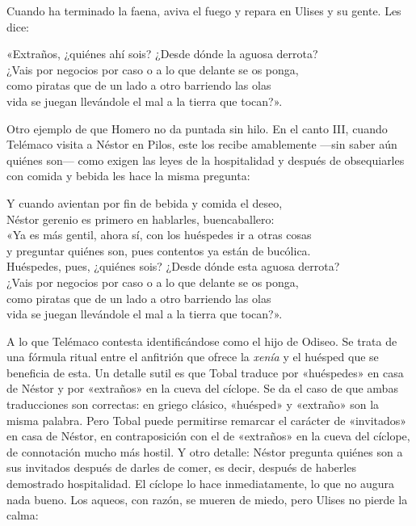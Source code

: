 Cuando ha terminado la faena, aviva el fuego y repara en Ulises y su gente. Les dice:

\begin{versocita}
«Extraños, ¿quiénes ahí sois? ¿Desde dónde la aguosa derrota?\\
¿Vais por negocios por caso o a lo que delante se os ponga,\\
como piratas que de un lado a otro barriendo las olas\\
vida se juegan llevándole el mal a la tierra que tocan?».
\end{versocita}

Otro ejemplo de que Homero no da puntada sin hilo. En el canto III, cuando Telémaco visita a Néstor en Pilos, este los recibe amablemente ---sin saber aún quiénes son--- como exigen las leyes de la hospitalidad y después de obsequiarles con comida y bebida les hace la misma pregunta:

\begin{versocita}
Y cuando avientan por fin de bebida y comida el deseo,\\
Néstor gerenio es primero en hablarles, buencaballero:\\
«Ya es más gentil, ahora sí, con los huéspedes ir a otras cosas\\
y preguntar quiénes son, pues contentos ya están de bucólica.\\
Huéspedes, pues, ¿quiénes sois? ¿Desde dónde esta aguosa derrota?\\
¿Vais por negocios por caso o a lo que delante se os ponga,\\
como piratas que de un lado a otro barriendo las olas\\
vida se juegan llevándole el mal a la tierra que tocan?».
\end{versocita}

A lo que Telémaco contesta identificándose como el hijo de Odiseo. Se trata de una fórmula ritual entre el anfitrión que ofrece la \emph{xenía} y el huésped que se beneficia de esta. Un detalle sutil es que Tobal traduce  por «huéspedes» en casa de Néstor y por «extraños» en la cueva del cíclope. Se da el caso de que ambas traducciones son correctas: en griego clásico, «huésped» y «extraño» son la misma palabra. Pero Tobal puede permitirse remarcar el carácter de «invitados» en casa de Néstor, en contraposición con el de «extraños» en la cueva del cíclope, de connotación mucho más hostil. Y otro detalle: Néstor pregunta quiénes son a sus invitados después de darles de comer, es decir, después de haberles demostrado hospitalidad. El cíclope lo hace inmediatamente, lo que no augura nada bueno. Los aqueos, con razón, se mueren de miedo, pero Ulises no pierde la calma:

